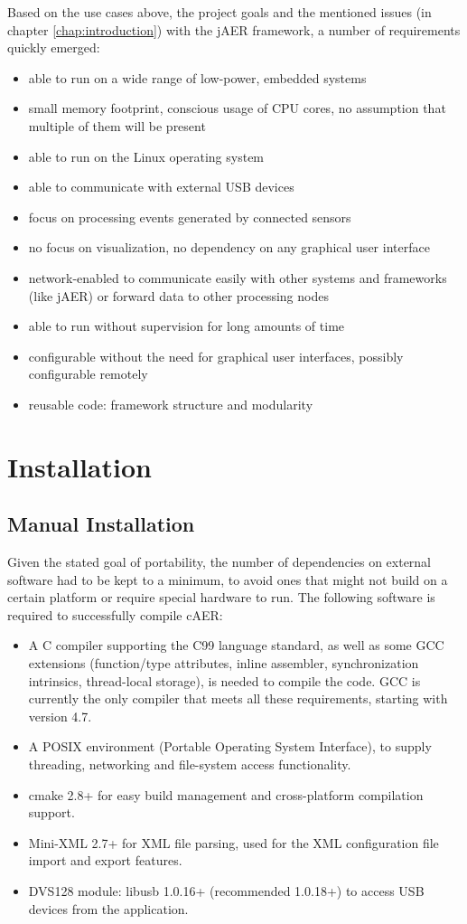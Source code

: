 \documentclass[a4paper,12pt]{report}
\begin{document}
Based on the use cases above, the project goals and the mentioned issues (in chapter \ref{chap:introduction}) with the jAER framework, a number of requirements quickly emerged:
\begin{itemize}
\item able to run on a wide range of low-power, embedded systems
\item small memory footprint, conscious usage of CPU cores, no assumption that multiple of them will be present
\item able to run on the Linux operating system
\item able to communicate with external USB devices
\item focus on processing events generated by connected sensors
\item no focus on visualization, no dependency on any graphical user interface
\item network-enabled to communicate easily with other systems and frameworks (like jAER) or forward data to other processing nodes
\item able to run without supervision for long amounts of time
\item configurable without the need for graphical user interfaces, possibly configurable remotely
\item reusable code: framework structure and modularity
\end{itemize}

\chapter{Installation} \label{chap:installation}

\section{Manual Installation} \label{sec:manual_installation}

Given the stated goal of portability, the number of dependencies on external software had to be kept to a minimum, to avoid ones that might not build on a certain platform or require special hardware to run.
\clearpage
The following software is required to successfully compile cAER:
\begin{itemize}
\item A C compiler supporting the C99 language standard, as well as some GCC extensions (function/type attributes, inline assembler, synchronization intrinsics, thread-local storage), is needed to compile the code. GCC is currently the only compiler that meets all these requirements, starting with version 4.7.
\item A POSIX environment (Portable Operating System Interface), to supply threading, networking and file-system access functionality.
\item cmake 2.8+ for easy build management and cross-platform compilation support.
\item Mini-XML 2.7+ for XML file parsing, used for the XML configuration file import and export features.
\item DVS128 module: libusb 1.0.16+ (recommended 1.0.18+) to access USB devices from the application.
\end{itemize}
\end{document}
